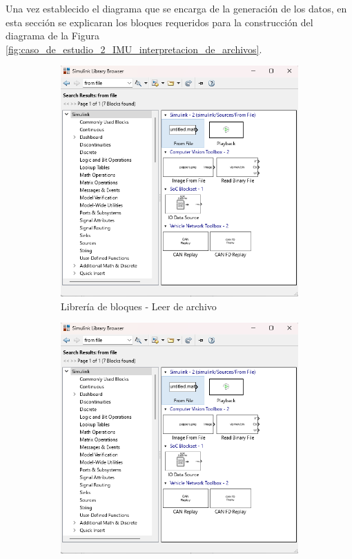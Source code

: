 Una vez establecido el diagrama que se encarga de la generación de los datos, en esta sección se explicaran los bloques requeridos para la construcción del diagrama de la Figura \ref{fig:caso_de_estudio_2_IMU_interpretacion_de_archivos}.

\begin{figure}[htbp]
    \centering
    \begin{subfigure}[b]{0.35\textwidth}
        \centering
        \includegraphics[width=\textwidth]{fig/Capitulo5/Caso_de_estudio_IMU/Generador_de_salidas/libreia_de_bloques_from_file.png}
        \caption{Librería de bloques - Leer de archivo}
        \label{fig:lib_bloques_from_file_IMU}
    \end{subfigure}
    \hfill
    \begin{subfigure}[b]{0.45\textwidth}
        \centering
        \includegraphics[width=\textwidth]{fig/Capitulo5/Caso_de_estudio_IMU/Generador_de_salidas/libreia_de_bloques_from_file.png}

\end{subfigure}
\end{figure}
